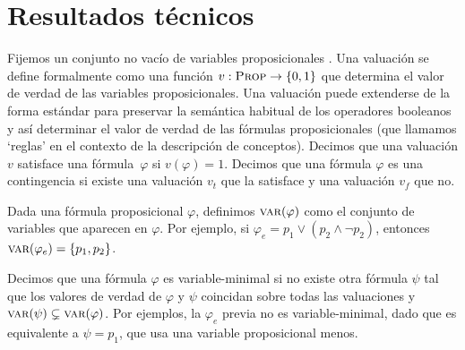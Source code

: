 \section{Resultados técnicos}\label{Sec:MainTheoremConcept}
Fijemos un conjunto no vacío de variables proposicionales \propvars. Una valuación se define formalmente como una función $ {v: \textsc{Prop} \rightarrow \{0,1 \}} $ que determina el valor de verdad de las variables proposicionales. Una valuación puede extenderse de la forma estándar para preservar la semántica habitual de los operadores booleanos y así determinar el valor de verdad de las fórmulas proposicionales (que llamamos `reglas' en el contexto de la descripción de conceptos). Decimos que una valuación $ v $ satisface una fórmula~$\varphi $ si $ v(\varphi) = 1 $. Decimos que una fórmula $ \varphi $ es una contingencia si existe una valuación $ v_t $ que la satisface y una valuación $ v_f $ que no.

Dada una fórmula proposicional $\varphi$, definimos $\textsc{var}(\varphi)$ como el conjunto de variables que aparecen en $\varphi$. Por ejemplo, si $\varphi_{e} = p_1 \lor (p_2 \land \lnot p_2)$, entonces $\textsc{var}(\varphi_e) = \{p_1, p_2\}$.

Decimos que una fórmula $\varphi$ es variable-minimal si no existe otra fórmula $\psi$ tal que los valores de verdad de $\varphi$ y $\psi$ coincidan sobre todas las valuaciones y $\textsc{var}(\psi) \subsetneq \textsc{var}(\varphi)$. Por ejemplos, la $\varphi_e$ previa no es variable-minimal, dado que es equivalente a $\psi = p_1$, que usa una variable proposicional menos. 

